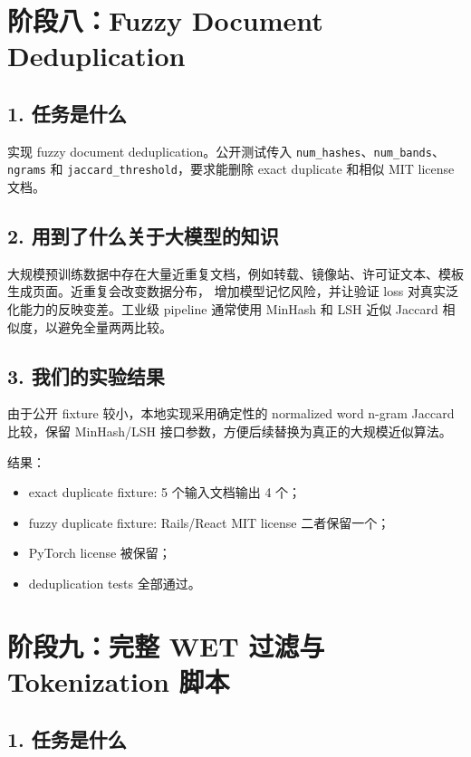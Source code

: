 \documentclass[UTF8,11pt]{ctexart}
\begin{document}
\section{阶段八：Fuzzy Document Deduplication}

\subsection*{1. 任务是什么}

实现 fuzzy document deduplication。公开测试传入 \texttt{num\_hashes}、\texttt{num\_bands}、
\texttt{ngrams} 和 \texttt{jaccard\_threshold}，要求能删除 exact duplicate 和相似 MIT license 文档。

\subsection*{2. 用到了什么关于大模型的知识}

大规模预训练数据中存在大量近重复文档，例如转载、镜像站、许可证文本、模板生成页面。近重复会改变数据分布，
增加模型记忆风险，并让验证 loss 对真实泛化能力的反映变差。工业级 pipeline 通常使用 MinHash 和 LSH
近似 Jaccard 相似度，以避免全量两两比较。

\subsection*{3. 我们的实验结果}

由于公开 fixture 较小，本地实现采用确定性的 normalized word n-gram Jaccard 比较，保留 MinHash/LSH
接口参数，方便后续替换为真正的大规模近似算法。

结果：

\begin{itemize}
  \item exact duplicate fixture: 5 个输入文档输出 4 个；
  \item fuzzy duplicate fixture: Rails/React MIT license 二者保留一个；
  \item PyTorch license 被保留；
  \item deduplication tests 全部通过。
\end{itemize}

\section{阶段九：完整 WET 过滤与 Tokenization 脚本}

\subsection*{1. 任务是什么}
\end{document}
